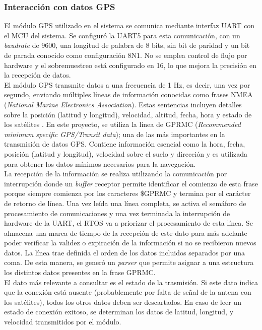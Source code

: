 \subsubsection{Interacción con datos GPS}

El módulo GPS utilizado en el sistema se comunica mediante interfaz UART con el MCU del sistema. Se configuró la UART5 para esta comunicación, con un \textit{baudrate} de 9600, una longitud de palabra de 8 bits, sin bit de paridad y un bit de parada conocido como configuración 8N1. No se emplea control de flujo por hardware y el sobremuestreo está configurado en 16, lo que mejora la precisión en la recepción de datos. \\ 

El módulo GPS transmite datos a una frecuencia de 1 Hz, es decir, una vez por segundo, enviando múltiples líneas de información conocidas como frases NMEA (\textit{National Marine Electronics Association}). Estas sentencias incluyen detalles sobre la posición (latitud y longitud), velocidad, altitud, fecha, hora y estado de los satélites \cite{nmea}. En este proyecto, se utiliza la línea de GPRMC (\textit{Recommended minimum specific GPS/Transit data}); una de las más importantes en la transmisión de datos GPS. Contiene información esencial como la hora, fecha, posición (latitud y longitud), velocidad sobre el suelo y dirección y es utilizada para obtener los datos mínimos necesarios para la navegación. \\ 

La recepción de la información se realiza utilizando la comunicación por interrupción donde un \textit{buffer} receptor permite identificar el comienzo de esta frase porque siempre comienza por los caracteres \$GPRMC y termina por el carácter de retorno de línea. Una vez leída una línea completa, se activa el semáforo de procesamiento de comunicaciones y una vez terminada la interrupción de hardware de la UART, el RTOS va a priorizar el procesamiento de esta línea. Se almacena una marca de tiempo de la recepción de este dato para más adelante poder verificar la validez o expiración de la información si no se recibieron nuevos datos. La línea trae definida el orden de los datos incluidos separados por una coma. De esta manera, se generó un \textit{parser} que permite asignar a una estructura los distintos datos presentes en la frase GPRMC. \\ 

El dato más relevante a consultar es el estado de la trasmisión. Si este dato indica que la conexión está ausente (probablemente por falta de señal de la antena con los satélites), todos los otros datos deben ser descartados. En caso de leer un estado de conexión exitoso, se determinan los datos de latitud, longitud, y velocidad transmitidos por el módulo. \\
